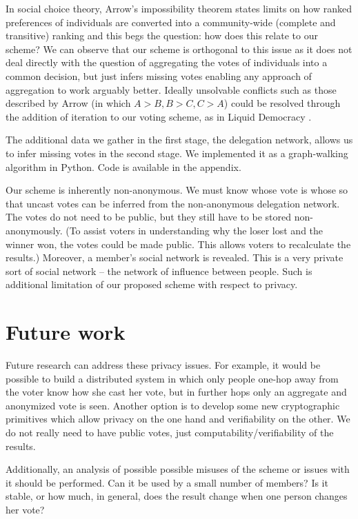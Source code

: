 \documentclass[a4paper]{acm_proc_article-sp}
\begin{document}
In social choice theory, Arrow's impossibility theorem\cite{arrow} states limits on how ranked preferences of individuals are
converted into a community-wide (complete and transitive) ranking and this begs the question: how does this relate to our
scheme? We can observe that our scheme is orthogonal to this issue as it does not deal directly with the question of aggregating
the votes of individuals into a common decision, but just infers missing votes enabling any approach of aggregation to work
arguably better.  Ideally unsolvable conflicts such as those described by Arrow (in which $A > B, B > C, C > A$) could be resolved through the addition of iteration to our voting scheme, as in Liquid Democracy \cite{liquiddem}.

The additional data we gather in the first stage, the delegation network, allows us to infer missing votes in the second stage.
We implemented it as a graph-walking algorithm in Python. Code is available in the appendix.

Our scheme is inherently non-anonymous. We must know whose vote is whose so that uncast votes
can be inferred from the non-anonymous delegation network. The votes do not need to be public, but they still have to be stored non-anonymously.  (To assist voters in understanding why the loser lost and the winner won, the votes could be made public.  This allows voters to recalculate the results.) Moreover, a member's social network is revealed. This is a very private sort of
social network -- the network of influence between people. Such is additional limitation of our proposed scheme with respect to privacy.

\section{Future work}

Future research can address these privacy issues. For example, it would be possible to build a distributed system in which only people
one-hop away from the voter know how she cast her vote, but in further hops only an aggregate and anonymized vote is seen. Another
option is to develop some new cryptographic primitives which allow privacy on the one hand and verifiability on the other.
We do not really need to have public votes, just computability/verifiability of the results.

Additionally, an analysis of possible possible misuses of the scheme or issues with it should be performed. Can it be used by a
small number of members? Is it stable, or how much, in general, does the result change when one person changes her vote?
\end{document}
